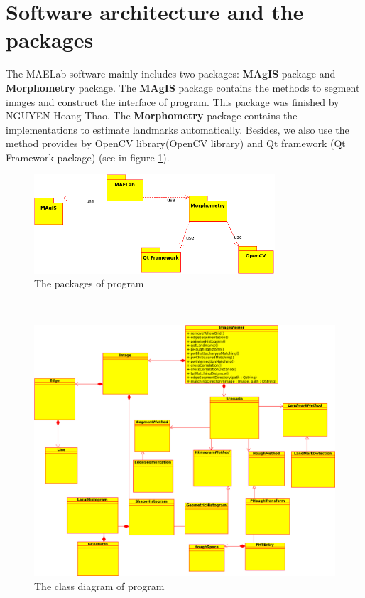 \section{Software architecture and the packages}
The MAELab software mainly includes two packages: \textbf{MAgIS} package and \textbf{Morphometry} package. The \textbf{MAgIS} package contains the methods to segment images and construct the interface of program. This package was finished by NGUYEN Hoang Thao. The \textbf{Morphometry} package contains the implementations to estimate landmarks automatically. Besides, we also use the method provides by OpenCV library(OpenCV library) and Qt framework (Qt Framework package) (see in figure \ref{fig:packages}).
\begin{figure}[h!]
\centering
\includegraphics[width=0.8\textwidth]{./images/packages}
\caption{The packages of program}
\label{fig:packages}
\end{figure}~\\
\begin{figure}[h!]
\centering
\includegraphics[width=1.1\textwidth]{./images/main}
\caption{The class diagram of program}
\label{fig:diagram}
\end{figure}

